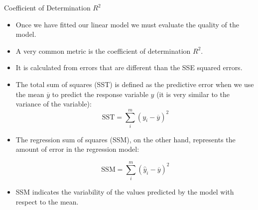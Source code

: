 \documentclass[handout]{beamer}
\begin{document}
\begin{frame}{Coefficient of Determination $R^2$}
\scriptsize{
\begin{itemize}
 \item  Once we have fitted our linear model we must evaluate the quality of the model.
 \item A very common metric is the coefficient of determination $R^2$. 
 \item  It is calculated from errors that are different than the SSE squared errors.
 \item The total sum of squares (SST)  is defined as the predictive error when we use the mean $\overline{y}$  to predict the response variable $y$ (it is very similar to the variance of the variable):
 \begin{displaymath}
  \text{SST} = \sum_{i}^{m}(y_i-\overline{y})^2  
 \end{displaymath}
 \item  The regression sum of squares (SSM), on the other hand, represents the amount of error in the regression model: 

 \begin{displaymath}
  \text{SSM} = \sum_{i}^{m}(\hat{y}_i-\overline{y})^2 
 \end{displaymath}
  
 \item  SSM indicates the variability of the values predicted by the model with respect to the mean. 
 
  
\end{itemize}

}
\end{frame}
\end{document}
